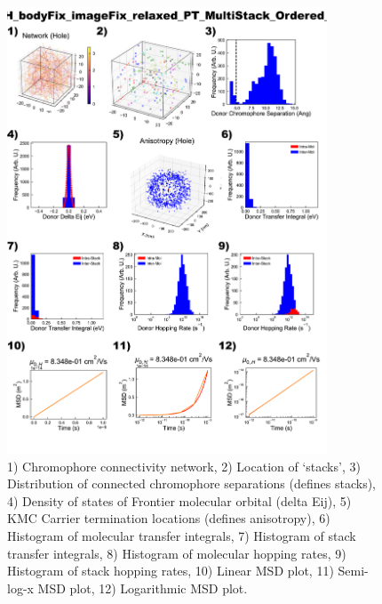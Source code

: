 \documentclass[12pt]{article}
\begin{document}
\begin{figure}[h]\centering
	\includegraphics[width=0.85\textwidth]{Figures/VRH_bodyFix_imageFix_relaxed_PT_MultiStack_Ordered_AA.png}
    \caption{   1) Chromophore connectivity network, 
                2) Location of `stacks', 
                3) Distribution of connected chromophore separations (defines stacks),
                4) Density of states of Frontier molecular orbital (delta Eij),
                5) KMC Carrier termination locations (defines anisotropy),
                6) Histogram of molecular transfer integrals,
                7) Histogram of stack transfer integrals,
                8) Histogram of molecular hopping rates,
                9) Histogram of stack hopping rates,
                10) Linear MSD plot,
                11) Semi-log-x MSD plot,
                12) Logarithmic MSD plot.}
	\label{fig:VRHPTMultOrd}
\end{figure}
\end{document}
